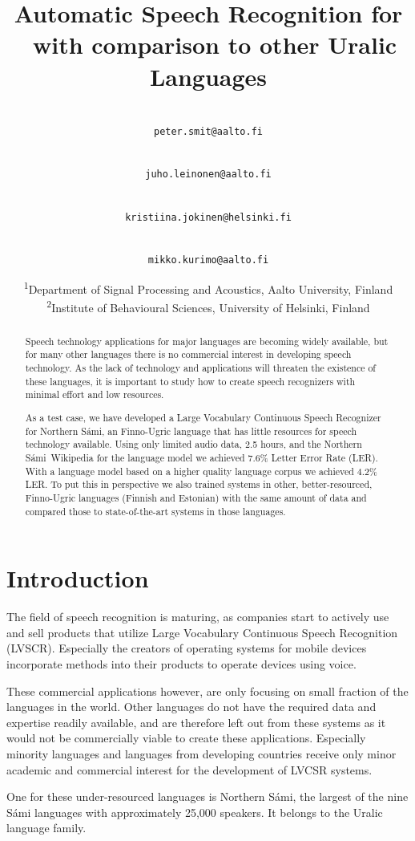 \documentclass[b5paper]{article}
\title{Automatic Speech Recognition for \ns\ with comparison to other Uralic Languages\blfootnote{
    This work is licensed under a Creative Commons Attribution–NoDerivatives
    4.0 International Licence.  Licence details:
    \url{http://creativecommons.org/licenses/by-nd/4.0/}
}}
\author{
\makebox[.45\linewidth]{Peter Smit\textsuperscript{1}}\\
\texttt{peter.smit@aalto.fi}
\\
\and 
\makebox[.45\linewidth]{Juho Leinonen\textsuperscript{1}}\\
\texttt{juho.leinonen@aalto.fi}
\\
\and 
\makebox[.45\linewidth]{Kristiina Jokinen\textsuperscript{2}}\\
\texttt{kristiina.jokinen@helsinki.fi}
\and
\makebox[.45\linewidth]{Mikko Kurimo\textsuperscript{1}}\\ 
\texttt{mikko.kurimo@aalto.fi}
\\ 
\and
\small\textsuperscript{1}Department of Signal Processing and Acoustics, Aalto University, Finland \\
\small\textsuperscript{2}Institute of Behavioural Sciences, University of Helsinki, Finland\\
}
\newcommand{\ns}{Northern Sámi}
\begin{document}
\maketitle

\begin{abstract} 
Speech technology applications for major languages are becoming widely available, but for many other languages there is no commercial interest in developing speech technology. As the lack of technology and applications will threaten the existence of these languages, it is important to study how to create speech recognizers with minimal effort and low resources.

As a test case, we have developed a Large Vocabulary Continuous Speech Recognizer for \ns, an Finno-Ugric language that has little resources for speech technology available. Using only limited audio data, 2.5 hours, and the \ns\ Wikipedia for the language model we achieved 7.6\% Letter Error Rate (LER). With a language model based on a higher quality language corpus we achieved 4.2\% LER. To put this in perspective we also trained systems in other, better-resourced, Finno-Ugric languages (Finnish and Estonian) with the same amount of data and compared those to state-of-the-art systems in those languages. 
\end{abstract}

\section{Introduction}

The field of speech recognition is maturing, as companies start to actively use and sell products that utilize Large Vocabulary Continuous Speech Recognition (LVSCR). Especially the creators of operating systems for mobile devices incorporate methods into their products to operate devices using voice.

These commercial applications however, are only focusing on small fraction of the languages in the world. Other languages do not have the required data and expertise readily available, and are therefore left out from these systems as it would not be commercially viable to create these applications. Especially minority languages and languages from developing countries receive only minor academic and commercial interest for the development of LVCSR systems. \cite{besacier2014automatic}

One for these under-resourced languages is \ns, the largest of the nine Sámi languages with approximately 25,000 speakers. It belongs to the Uralic language family. \cite{ethno18}
\end{document}
